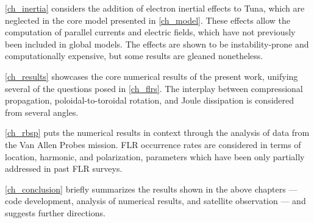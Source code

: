 \cref{ch_inertia} considers the addition of electron inertial effects to Tuna,
which are neglected in the core model presented in \cref{ch_model}. These
effects allow the computation of parallel currents and electric fields, which
have not previously been included in global \Alfven models. The effects are
shown to be instability-prone and computationally expensive, but some results
are gleaned nonetheless. 

\cref{ch_results} showcases the core numerical results of the present work,
unifying several of the questions posed in \cref{ch_flrs}. The interplay
between compressional propagation, poloidal-to-toroidal rotation, and Joule
dissipation is considered from several angles. 

\cref{ch_rbsp} puts the numerical results in context through the analysis of
data from the Van Allen Probes mission. FLR occurrence rates are considered in
terms of location, harmonic, and polarization, parameters which have been only
partially addressed in past FLR surveys. 

\cref{ch_conclusion} briefly summarizes the results shown in the above chapters
--- code development, analysis of numerical results, and satellite observation
--- and suggests further directions. 






